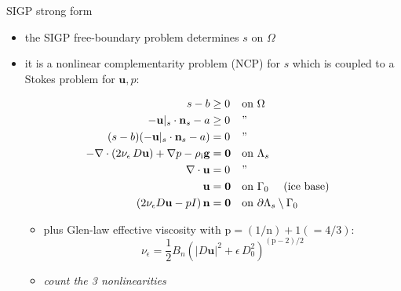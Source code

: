 \documentclass[usepdftitle=false]{beamer}
\newcommand{\tikzmark}[1]{\tikz[overlay,remember picture] \node (#1) {};}
\newcommand{\eps}{\epsilon}
\newcommand{\bn}{\mathbf{n}}
\newcommand{\bu}{\mathbf{u}}
\newcommand{\bzero}{\bm{0}}
\newcommand{\rhoi}{\rho_{\text{i}}}
\newcommand{\pp}{{\text{p}}}
\begin{document}
\begin{frame}{SIGP strong form}

\begin{itemize}
\item the SIGP free-boundary problem determines $s$ on $\Omega$
\item it is a \alert{nonlinear complementarity problem (NCP) for $s$ which is coupled to a Stokes problem for $\bu,p$:}

\vspace{-5mm}

\begin{align*}
s - b &\ge 0 && \text{on $\Omega$} & \tikzmark{ncptop} \\
- \bu|_s \cdot \bn_s - a &\ge 0 && \text{''} \\
(s - b) (- \bu|_s \cdot \bn_s - a) &= 0 && \text{''} & \tikzmark{ncpbot} \\
- \nabla \cdot \left(2 \nu_\eps\, D\bu\right) + \nabla p - \rhoi \mathbf{g} &= \bzero && \text{on $\Lambda_s$} & \tikzmark{gstop} \\
\nabla \cdot \bu &= 0 && \text{''} \\
\bu &= \bzero && \text{on $\Gamma_0$ \quad (ice base)} \\
\left(2 \nu_\eps D\bu - pI\right) \bn &= \bzero && \text{on $\partial \Lambda_s \setminus \Gamma_0$} & \tikzmark{gsbot}
\end{align*}



\vspace{-8mm}

    \begin{itemize}
    \item plus Glen-law effective viscosity with $\text{p}=(1/\text{n})+1(=4/3)$:
      $$\nu_\eps = \frac{1}{2} B_n \left(|D\bu|^2 + \eps\, D_0^2\right)^{(\pp-2)/2}$$
    \item \emph{count the 3 nonlinearities}
    \end{itemize}
\end{itemize}
\end{frame}
\end{document}

